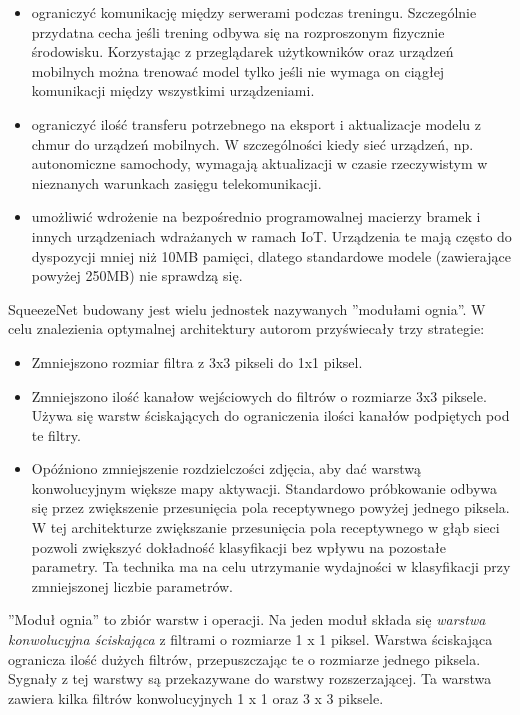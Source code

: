 \documentclass[12pt,a4paper,twoside,titlepage,openright]{book}
\begin{document}
\begin{itemize}
\item ograniczyć komunikację między serwerami podczas treningu. Szczególnie przydatna cecha jeśli trening odbywa się na rozproszonym fizycznie środowisku. Korzystając z przeglądarek użytkowników oraz urządzeń mobilnych można trenować model tylko jeśli nie wymaga on ciągłej komunikacji między wszystkimi urządzeniami.
\item ograniczyć ilość transferu potrzebnego na eksport i aktualizacje modelu z chmur do urządzeń mobilnych. W szczególności kiedy sieć urządzeń, np. autonomiczne samochody, wymagają aktualizacji w czasie rzeczywistym w nieznanych warunkach zasięgu telekomunikacji.
\item umożliwić wdrożenie na bezpośrednio programowalnej macierzy bramek i innych urządzeniach wdrażanych w ramach IoT. Urządzenia te mają często do dyspozycji mniej niż 10MB pamięci, dlatego standardowe modele (zawierające powyżej 250MB) nie sprawdzą się.
\end{itemize}

SqueezeNet budowany jest wielu jednostek nazywanych ''modułami ognia''. 
W celu znalezienia optymalnej architektury autorom przyświecały trzy strategie:
\begin{itemize}
\item Zmniejszono rozmiar filtra z 3x3 pikseli do 1x1 piksel.
\item Zmniejszono ilość kanałow wejściowych do filtrów o rozmiarze 3x3 piksele. Używa się warstw ściskających do ograniczenia ilości kanałów podpiętych pod te filtry.
\item Opóźniono zmniejszenie rozdzielczości zdjęcia, aby dać warstwą konwolucyjnym większe mapy aktywacji. Standardowo próbkowanie odbywa się przez zwiększenie przesunięcia pola receptywnego powyżej jednego piksela. W tej architekturze zwiększanie przesunięcia pola receptywnego w głąb sieci pozwoli zwiększyć dokładność klasyfikacji bez wpływu na pozostałe parametry. Ta technika ma na celu utrzymanie wydajności w klasyfikacji przy zmniejszonej liczbie parametrów.
\end{itemize}

''Moduł ognia'' to zbiór warstw i operacji. Na jeden moduł składa się \textit{warstwa konwolucyjna ściskająca} z filtrami o rozmiarze 1 x 1 piksel. Warstwa ściskająca ogranicza ilość dużych filtrów, przepuszczając te o rozmiarze jednego piksela. Sygnały z tej warstwy są przekazywane do warstwy rozszerzającej. Ta warstwa zawiera kilka filtrów konwolucyjnych 1 x 1 oraz 3 x 3 piksele. 
\end{document}
